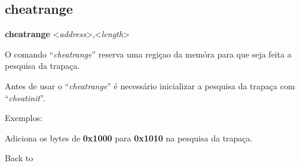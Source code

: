 \documentclass[letterpaper,10pt,brazil]{sphinxmanual}
\begin{document}
\subsection{cheatrange}
\label{debugger/cheats:debugger-command-cheatrange}\label{debugger/cheats:cheatrange}
\begin{DUlineblock}{0em}
\item[]
\begin{DUlineblock}{\DUlineblockindent}
\item[] \textbf{cheatrange} \textless{}\emph{address}\textgreater{},\textless{}\emph{length}\textgreater{}
\item[] 
\end{DUlineblock}
\item[] O comando ``\emph{cheatrange}'' reserva uma regiçao da memóra para que seja feita a pesquisa da trapaça.
\item[] 
\item[] Antes de usar o ``\emph{cheatrange}'' é necessário inicializar a pesquisa da trapaça com ``\emph{cheatinit}''.
\item[] 
\item[] Exemplos:
\item[] 
\item[]
\begin{DUlineblock}{\DUlineblockindent}
\item[] 
\item[] 
\end{DUlineblock}
\item[] Adiciona os bytes de \textbf{0x1000} para \textbf{0x1010} na pesquisa da trapaça.
\item[] 
\item[] Back to {\hyperref[debugger/cheats:debugger\string-cheats\string-list]{}}
\end{DUlineblock}
\begin{quote}
\label{debugger/cheats:debugger-command-cheatnext}\end{quote}
\end{document}
